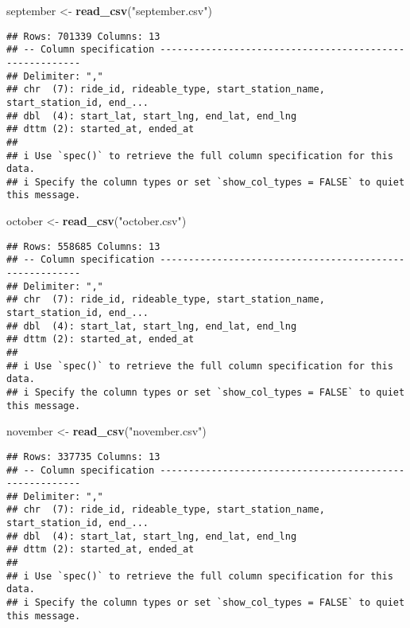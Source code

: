 \documentclass[
]{article}
\newenvironment{Shaded}{\begin{snugshade}}{\end{snugshade}}
\newcommand{\FunctionTok}[1]{\textcolor[rgb]{0.13,0.29,0.53}{\textbf{#1}}}
\newcommand{\NormalTok}[1]{#1}
\newcommand{\OtherTok}[1]{\textcolor[rgb]{0.56,0.35,0.01}{#1}}
\newcommand{\StringTok}[1]{\textcolor[rgb]{0.31,0.60,0.02}{#1}}
\begin{document}
\begin{Shaded}
\begin{Highlighting}[]
\NormalTok{september }\OtherTok{\textless{}{-}} \FunctionTok{read\_csv}\NormalTok{(}\StringTok{"september.csv"}\NormalTok{)}
\end{Highlighting}
\end{Shaded}

\begin{verbatim}
## Rows: 701339 Columns: 13
## -- Column specification --------------------------------------------------------
## Delimiter: ","
## chr  (7): ride_id, rideable_type, start_station_name, start_station_id, end_...
## dbl  (4): start_lat, start_lng, end_lat, end_lng
## dttm (2): started_at, ended_at
## 
## i Use `spec()` to retrieve the full column specification for this data.
## i Specify the column types or set `show_col_types = FALSE` to quiet this message.
\end{verbatim}

\begin{Shaded}
\begin{Highlighting}[]
\NormalTok{october }\OtherTok{\textless{}{-}} \FunctionTok{read\_csv}\NormalTok{(}\StringTok{"october.csv"}\NormalTok{)}
\end{Highlighting}
\end{Shaded}

\begin{verbatim}
## Rows: 558685 Columns: 13
## -- Column specification --------------------------------------------------------
## Delimiter: ","
## chr  (7): ride_id, rideable_type, start_station_name, start_station_id, end_...
## dbl  (4): start_lat, start_lng, end_lat, end_lng
## dttm (2): started_at, ended_at
## 
## i Use `spec()` to retrieve the full column specification for this data.
## i Specify the column types or set `show_col_types = FALSE` to quiet this message.
\end{verbatim}

\begin{Shaded}
\begin{Highlighting}[]
\NormalTok{november }\OtherTok{\textless{}{-}} \FunctionTok{read\_csv}\NormalTok{(}\StringTok{"november.csv"}\NormalTok{)}
\end{Highlighting}
\end{Shaded}

\begin{verbatim}
## Rows: 337735 Columns: 13
## -- Column specification --------------------------------------------------------
## Delimiter: ","
## chr  (7): ride_id, rideable_type, start_station_name, start_station_id, end_...
## dbl  (4): start_lat, start_lng, end_lat, end_lng
## dttm (2): started_at, ended_at
## 
## i Use `spec()` to retrieve the full column specification for this data.
## i Specify the column types or set `show_col_types = FALSE` to quiet this message.
\end{verbatim}
\end{document}
